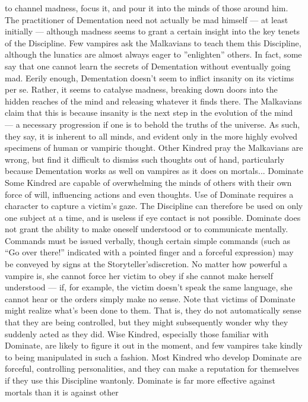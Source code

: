 \documentclass[10pt,a4paper]{article}
\begin{document}
to channel madness, focus it, and pour it into the minds of those around
him.
The practitioner of Dementation need not actually be mad himself — at
least initially — although madness seems to grant a certain insight into the
key tenets of the Discipline. Few vampires ask the Malkavians to teach
them this Discipline, although the lunatics are almost always eager to
”enlighten” others. In fact, some say that one cannot learn the secrets of
Dementation without eventually going mad.
Eerily enough, Dementation doesn't seem to inflict insanity on its victims
per se. Rather, it seems to catalyse madness, breaking down doors into the
hidden reaches of the mind and releasing whatever it finds there. The
Malkavians claim that this is because insanity is the next step in the
evolution of the mind — a necessary progression if one is to behold the
truths of the universe. As such, they say, it is inherent to all minds, and
evident only in the more highly evolved specimens of human or vampiric
thought. Other Kindred pray the Malkavians are wrong, but find it difficult
to dismiss such thoughts out of hand, particularly because Dementation
works as well on vampires as it does on mortals...
Dominate
Some Kindred are capable of overwhelming the minds of others with their
own force of will, influencing actions and even thoughts. Use of Dominate
requires a character to capture a victim’s gaze. The Discipline can therefore
be used on only one subject at a time, and is useless if eye contact is not
possible.
Dominate does not grant the ability to make oneself understood or to
communicate mentally. Commands must be issued verbally, though certain
simple commands (such as “Go over there!” indicated with a pointed finger
and a forceful expression) may be conveyed by signs at the Storyteller’sdiscretion. No matter how powerful a vampire is, she cannot force her
victim to obey if she cannot make herself understood — if, for example, the
victim doesn’t speak the same language, she cannot hear or the orders
simply make no sense.
Note that victims of Dominate might realize what’s been done to them. That
is, they do not automatically sense that they are being controlled, but they
might subsequently wonder why they suddenly acted as they did. Wise
Kindred, especially those familiar with Dominate, are likely to figure it out
in the moment, and few vampires take kindly to being manipulated in such a
fashion. Most Kindred who develop Dominate are forceful, controlling
personalities, and they can make a reputation for themselves if they use this
Discipline wantonly.
Dominate is far more effective against mortals than it is against other
\end{document}
